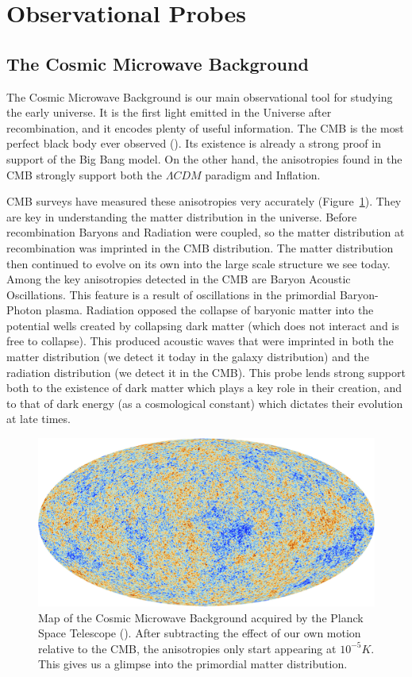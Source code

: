 \section{Observational Probes}
\subsection{The Cosmic Microwave Background}

The Cosmic Microwave Background is our main observational tool for studying the early universe. It is the first light emitted in the Universe after recombination, and it encodes plenty of useful information. The CMB is the most perfect black body ever observed (\cite{1999dpf..conf.....W}). Its existence is already a strong proof in support of the Big Bang model. On the other hand, the anisotropies found in the CMB strongly support both the $\Lambda CDM$ paradigm and Inflation.

CMB surveys have measured these anisotropies very accurately (Figure~\ref{fig:1.1}). They are key in understanding the matter distribution in the universe. Before recombination Baryons and Radiation were coupled, so the matter distribution at recombination was imprinted in the CMB distribution. The matter distribution then continued to evolve on its own into the large scale structure we see today. Among the key anisotropies detected in the CMB are Baryon Acoustic Oscillations. This feature is a result of oscillations in the primordial Baryon-Photon plasma. Radiation opposed the collapse of baryonic matter into the potential wells created by collapsing dark matter (which does not interact and is free to collapse). This produced acoustic waves that were imprinted in both the matter distribution (we detect it today in the galaxy distribution) and the radiation distribution (we detect it in the CMB). This probe lends strong support both to the existence of dark matter which plays a key role in their creation, and to that of dark energy (as a cosmological constant) which dictates their evolution at late times.

\begin{figure}
    \centering
    \includegraphics[width=0.9\columnwidth]{images/misc/Planck_CMB.jpg}%
    

    \caption{
    Map of the Cosmic Microwave Background acquired by the Planck Space Telescope (\cite{2016A&A...594A..13P}). After subtracting the effect of our own motion relative to the CMB, the anisotropies only start appearing at $10^{-5} K$. This gives us a glimpse into the primordial matter distribution.
    }
    
    \label{fig:1.1}
\end{figure}

